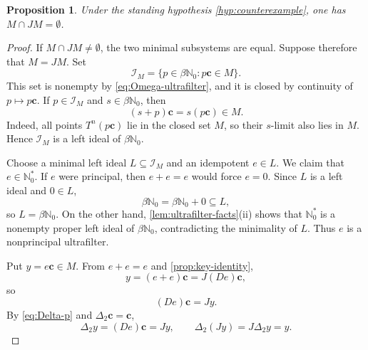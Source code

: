 \documentclass[reqno,12pt]{amsart}
\newtheorem{prop}[thm]{Proposition}
\newcommand{\Nzero}{\mathbb N_0}
\newcommand{\bN}{\beta\Nzero}
\newcommand{\Nstar}{\Nzero^{*}}
\numberwithin{equation}{section}
\begin{document}
\begin{prop}\label{prop:disjoint-minimal}
	Under the standing hypothesis \eqref{hyp:counterexample}, one has
	$M\cap JM=\emptyset$.
\end{prop}

\begin{proof}
  If $M\cap JM\neq\emptyset$, the two minimal subsystems are equal.  Suppose
therefore that $M=JM$.
Set
\[
   \mathcal I_M=\{p\in\bN:p\mathbf c\in M\}.
\]
This set is nonempty by \eqref{eq:Omega-ultrafilter}, and it is closed by
continuity of $p\mapsto p\mathbf c$.  If $p\in\mathcal I_M$ and
$s\in\bN$, then
\[
   (s+p)\mathbf c=s(p\mathbf c)\in M.
\]
Indeed, all points $T^n(p\mathbf c)$ lie in the closed set $M$, so their
$s$-limit also lies in $M$.  Hence $\mathcal I_M$ is a left ideal of $\bN$.

Choose a minimal left ideal $L\subseteq\mathcal I_M$ and an idempotent
$e\in L$.  We claim that $e\in\Nstar$.  If $e$ were principal, then
$e+e=e$ would force $e=0$.  Since $L$ is a left ideal and $0\in L$,
\[
   \bN=\bN+0\subseteq L,
\]
so $L=\bN$.  On the other hand, \cref{lem:ultrafilter-facts}(ii) shows that
$\Nstar$ is a nonempty proper left ideal of $\bN$, contradicting the
minimality of $L$.  Thus $e$ is a nonprincipal ultrafilter.

Put $y=e\mathbf c\in M$.  From $e+e=e$ and
\cref{prop:key-identity},
\[
   y=(e+e)\mathbf c=J(De)\mathbf c,
\]
so
\begin{equation}\label{eq:De-c}
   (De)\mathbf c=Jy.
\end{equation}
By \eqref{eq:Delta-p} and $\Delta_2\mathbf c=\mathbf c$,
\begin{equation}\label{eq:Delta-y}
   \Delta_2 y=(De)\mathbf c=Jy,
   \qquad
   \Delta_2(Jy)=J\Delta_2 y=y.
\end{equation}


\end{proof}
\end{document}
